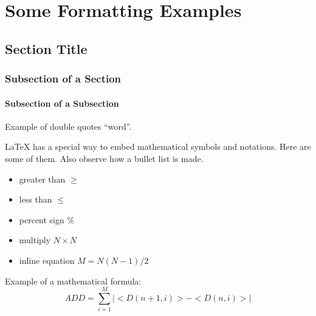 \chapter{Some Formatting Examples}
\section{Section Title}
\subsection{Subsection of a Section}
\subsubsection{Subsection of a Subsection}

Example of double quotes ``word''. 

LaTeX{} has a special way to embed mathematical symbols and notations. Here are some of them. Also observe how a bullet list is made.

\begin{itemize}\itemsep0pt \parskip0pt 
\item greater than $\ge$
\item less than $\le$
\item percent sign \%
\item multiply $N\times N$
\item inline equation $M = N(N-1)/2$
\end{itemize}

Example of a mathematical formula:
\begin{equation}
  ADD = \sum_{i=1}^{M}|<D(n+1,i)>-<D(n,i)>|
  \label{add}
\end{equation}

